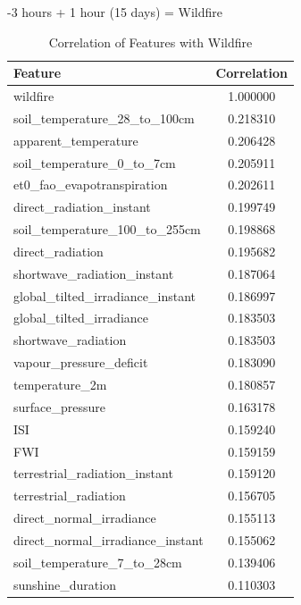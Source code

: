 -3 hours + 1 hour (15 days) = Wildfire
\begin{table}[H]
	\caption{Correlation of Features with Wildfire}
	\centering
	\label{wildfire_correlation}
	\begin{tabular}{lc}
		\hline
		Feature                                   & Correlation \\ \hline
		wildfire                                  & 1.000000    \\ 
		soil\_temperature\_28\_to\_100cm        & 0.218310    \\ 
		apparent\_temperature                    & 0.206428    \\ 
		soil\_temperature\_0\_to\_7cm           & 0.205911    \\ 
		et0\_fao\_evapotranspiration            & 0.202611    \\ 
		direct\_radiation\_instant              & 0.199749    \\ 
		soil\_temperature\_100\_to\_255cm       & 0.198868    \\ 
		direct\_radiation                       & 0.195682    \\ 
		shortwave\_radiation\_instant           & 0.187064    \\ 
		global\_tilted\_irradiance\_instant      & 0.186997    \\ 
		global\_tilted\_irradiance              & 0.183503    \\ 
		shortwave\_radiation                    & 0.183503    \\ 
		vapour\_pressure\_deficit               & 0.183090    \\ 
		temperature\_2m                         & 0.180857    \\ 
		surface\_pressure                       & 0.163178    \\ 
		ISI                                      & 0.159240    \\ 
		FWI                                     & 0.159159    \\ 
		terrestrial\_radiation\_instant         & 0.159120    \\ 
		terrestrial\_radiation                  & 0.156705    \\ 
		direct\_normal\_irradiance              & 0.155113    \\ 
		direct\_normal\_irradiance\_instant     & 0.155062    \\ 
		soil\_temperature\_7\_to\_28cm         & 0.139406    \\ 
		sunshine\_duration                      & 0.110303    \\ 

\end{tabular}
\end{table}

